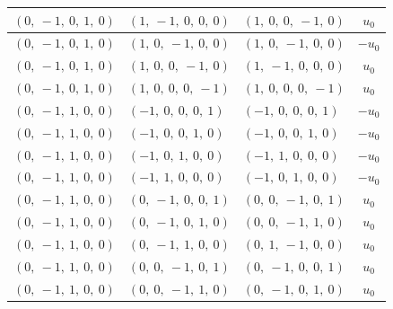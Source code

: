 \documentclass[11pt]{article}
\theoremstyle{definition}
\begin{document}
\begin{longtable}{|l|l|l|c|}
    \hline
    $\left( 0, \  -1, \  0, \  1, \  0\right)$ & $\left( 1, \  -1, \  0, \  0, \  0\right)$ & $\left( 1, \  0, \  0, \  -1, \  0\right)$ & $u_{0}$ \\
    \hline
    $\left( 0, \  -1, \  0, \  1, \  0\right)$ & $\left( 1, \  0, \  -1, \  0, \  0\right)$ & $\left( 1, \  0, \  -1, \  0, \  0\right)$ & $- u_{0}$ \\
    \hline
    $\left( 0, \  -1, \  0, \  1, \  0\right)$ & $\left( 1, \  0, \  0, \  -1, \  0\right)$ & $\left( 1, \  -1, \  0, \  0, \  0\right)$ & $u_{0}$ \\
    \hline
    $\left( 0, \  -1, \  0, \  1, \  0\right)$ & $\left( 1, \  0, \  0, \  0, \  -1\right)$ & $\left( 1, \  0, \  0, \  0, \  -1\right)$ & $u_{0}$ \\
    \hline
    $\left( 0, \  -1, \  1, \  0, \  0\right)$ & $\left( -1, \  0, \  0, \  0, \  1\right)$ & $\left( -1, \  0, \  0, \  0, \  1\right)$ & $- u_{0}$ \\
    \hline
    $\left( 0, \  -1, \  1, \  0, \  0\right)$ & $\left( -1, \  0, \  0, \  1, \  0\right)$ & $\left( -1, \  0, \  0, \  1, \  0\right)$ & $- u_{0}$ \\
    \hline
    $\left( 0, \  -1, \  1, \  0, \  0\right)$ & $\left( -1, \  0, \  1, \  0, \  0\right)$ & $\left( -1, \  1, \  0, \  0, \  0\right)$ & $- u_{0}$ \\
    \hline
    $\left( 0, \  -1, \  1, \  0, \  0\right)$ & $\left( -1, \  1, \  0, \  0, \  0\right)$ & $\left( -1, \  0, \  1, \  0, \  0\right)$ & $- u_{0}$ \\
    \hline
    $\left( 0, \  -1, \  1, \  0, \  0\right)$ & $\left( 0, \  -1, \  0, \  0, \  1\right)$ & $\left( 0, \  0, \  -1, \  0, \  1\right)$ & $u_{0}$ \\
    \hline
    $\left( 0, \  -1, \  1, \  0, \  0\right)$ & $\left( 0, \  -1, \  0, \  1, \  0\right)$ & $\left( 0, \  0, \  -1, \  1, \  0\right)$ & $u_{0}$ \\
    \hline
    $\left( 0, \  -1, \  1, \  0, \  0\right)$ & $\left( 0, \  -1, \  1, \  0, \  0\right)$ & $\left( 0, \  1, \  -1, \  0, \  0\right)$ & $u_{0}$ \\
    \hline
    $\left( 0, \  -1, \  1, \  0, \  0\right)$ & $\left( 0, \  0, \  -1, \  0, \  1\right)$ & $\left( 0, \  -1, \  0, \  0, \  1\right)$ & $u_{0}$ \\
    \hline
    $\left( 0, \  -1, \  1, \  0, \  0\right)$ & $\left( 0, \  0, \  -1, \  1, \  0\right)$ & $\left( 0, \  -1, \  0, \  1, \  0\right)$ & $u_{0}$ \\

\end{longtable}
\end{document}
